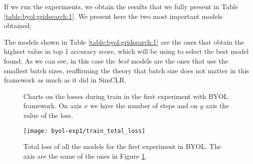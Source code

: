 If we run the experiments, we obtain the results that we fully present in Table \ref{table:byol:gridsearch:1}. We present here the two most important models obtained:

\begin{table}[H]
    \caption{All results for BYOL's experiment on the influence of batch size.}
    \label{table:byol:gridsearch:1}
    \end{table}

The models shown in Table \ref{table:byol:gridsearch:1} are the ones that obtain the highest value in top 1 accuracy score, which will be using to select the best model found. As we can see, in this case the \emph{best} models are the ones that use the smallest batch sizes, reaffirming the theory that batch size does not matter in this framework as much as it did in SimCLR.

\begin{figure}[htp] 
    \centering
    \hfill%
        \caption{Charts on the losses during train in the first experiment with BYOL framework. On axis $x$ we have the number of steps and on $y$ axis the value of the loss.}
        \label{fig:byol:exp1:both:losses}
\end{figure}

\begin{figure}[H]
\centering
\texttt{[image: byol-exp1/train\_total\_loss]}%
\caption{Total loss of all the models for the first experiment in BYOL. The axis are the same of the ones in Figure \ref{fig:byol:exp1:both:losses}. }
\label{fig:byol:total:loss:exp1}%
\end{figure}

